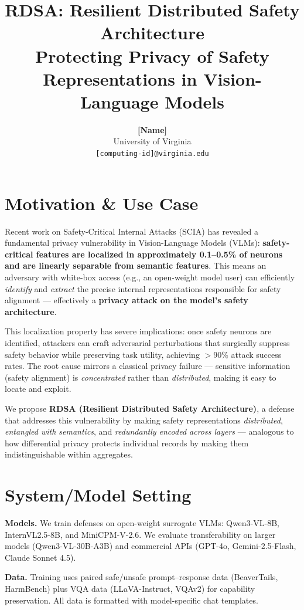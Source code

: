 \documentclass[11pt]{article}
\title{\vspace{-2em}\textbf{RDSA: Resilient Distributed Safety Architecture} \\
\large Protecting Privacy of Safety Representations in Vision-Language Models\vspace{-0.5em}}
\author{
  \textbf{[Name]} \\
  University of Virginia \\
  \texttt{[computing-id]@virginia.edu}
}
\date{}
\begin{document}
\maketitle
\vspace{-1.5em}

\section{Motivation \& Use Case}

Recent work on Safety-Critical Internal Attacks (SCIA) has revealed a fundamental privacy vulnerability in Vision-Language Models (VLMs): \textbf{safety-critical features are localized in approximately 0.1--0.5\% of neurons and are linearly separable from semantic features}. This means an adversary with white-box access (e.g., an open-weight model user) can efficiently \emph{identify} and \emph{extract} the precise internal representations responsible for safety alignment --- effectively a \textbf{privacy attack on the model's safety architecture}.

This localization property has severe implications: once safety neurons are identified, attackers can craft adversarial perturbations that surgically suppress safety behavior while preserving task utility, achieving $>$90\% attack success rates. The root cause mirrors a classical privacy failure --- sensitive information (safety alignment) is \emph{concentrated} rather than \emph{distributed}, making it easy to locate and exploit.

We propose \textbf{RDSA (Resilient Distributed Safety Architecture)}, a defense that addresses this vulnerability by making safety representations \emph{distributed}, \emph{entangled with semantics}, and \emph{redundantly encoded across layers} --- analogous to how differential privacy protects individual records by making them indistinguishable within aggregates.

\section{System/Model Setting}

\textbf{Models.} We train defenses on open-weight surrogate VLMs: Qwen3-VL-8B, InternVL2.5-8B, and MiniCPM-V-2.6. We evaluate transferability on larger models (Qwen3-VL-30B-A3B) and commercial APIs (GPT-4o, Gemini-2.5-Flash, Claude Sonnet 4.5).

\textbf{Data.} Training uses paired safe/unsafe prompt--response data (BeaverTails, HarmBench) plus VQA data (LLaVA-Instruct, VQAv2) for capability preservation. All data is formatted with model-specific chat templates.
\end{document}

